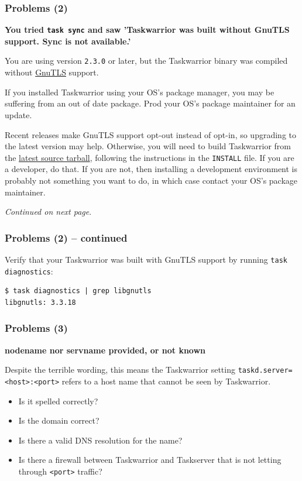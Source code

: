 \documentclass[t,handout]{beamer}
\begin{document}
\begin{frame}[fragile]\frametitle{Problems (2)}
    \textbf{You tried \texttt{task sync} and saw 'Taskwarrior was built without GnuTLS support.  Sync is not available.'}

    You are using version \verb+2.3.0+ or later, but the Taskwarrior binary was compiled without \href{http://www.gnutls.org}{GnuTLS} support.

    If you installed Taskwarrior using your OS's package manager, you may be suffering from an out of date package. Prod your OS's package maintainer for an update.

    Recent releases make GnuTLS support opt-out instead of opt-in, so upgrading to the latest version may help. Otherwise, you will need to build Taskwarrior from the \href{http://taskwarrior.org/download/task-latest.tar.gz}{latest source tarball}, following the instructions in the \verb+INSTALL+ file. If you are a developer, do that. If you are not, then installing a development environment is probably not something you want to do, in which case contact your OS's package maintainer.

    \emph{Continued on next page}.
\end{frame}

\begin{frame}[fragile]\frametitle{Problems (2) -- continued}
    Verify that your Taskwarrior was built with GnuTLS support by running \verb+task diagnostics+:

    \begin{lstlisting}
$ task diagnostics | grep libgnutls
libgnutls: 3.3.18\end{lstlisting}
\end{frame}

\begin{frame}[fragile]\frametitle{Problems (3)}
    \textbf{nodename nor servname provided, or not known}

    Despite the terrible wording, this means the Taskwarrior setting \verb+taskd.server=<host>:<port>+ refers to a host name that cannot be seen by Taskwarrior.

    \begin{itemize}
        \item Is it spelled correctly?
        \item Is the domain correct?
        \item Is there a valid DNS resolution for the name?
        \item Is there a firewall between Taskwarrior and Taskserver that is not letting through \verb+<port>+ traffic?
    \end{itemize}
\end{frame}
\end{document}
